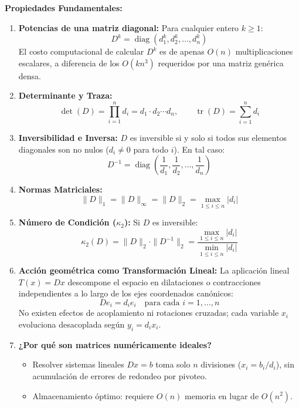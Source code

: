 \documentclass[11pt,a4paper]{article}
\begin{document}
\textbf{Propiedades Fundamentales:}
\begin{enumerate}
    \item \textbf{Potencias de una matriz diagonal:} Para cualquier entero $k \ge 1$:
    \[
    D^k = \operatorname{diag}(d_1^k, d_2^k, \dots, d_n^k)
    \]
    El costo computacional de calcular $D^k$ es de apenas $O(n)$ multiplicaciones escalares, a diferencia de los $O(k n^3)$ requeridos por una matriz genérica densa.
    
    \item \textbf{Determinante y Traza:}
    \[
    \det(D) = \prod_{i=1}^n d_i = d_1 \cdot d_2 \cdots d_n, \qquad \operatorname{tr}(D) = \sum_{i=1}^n d_i
    \]
    
    \item \textbf{Inversibilidad e Inversa:} $D$ es inversible si y solo si todos sus elementos diagonales son no nulos ($d_i \neq 0$ para todo $i$). En tal caso:
    \[
    D^{-1} = \operatorname{diag}\left(\frac{1}{d_1}, \frac{1}{d_2}, \dots, \frac{1}{d_n}\right)
    \]
    
    \item \textbf{Normas Matriciales:}
    \[
    \|D\|_1 = \|D\|_\infty = \|D\|_2 = \max_{1 \le i \le n} |d_i|
    \]
    
    \item \textbf{Número de Condición ($\kappa_2$):} Si $D$ es inversible:
    \[
    \kappa_2(D) = \|D\|_2 \cdot \|D^{-1}\|_2 = \frac{\max_{1 \le i \le n} |d_i|}{\min_{1 \le i \le n} |d_i|}
    \]
    
    \item \textbf{Acción geométrica como Transformación Lineal:} La aplicación lineal $T(x) = D x$ descompone el espacio en dilataciones o contracciones independientes a lo largo de los ejes coordenados canónicos:
    \[
    D e_i = d_i e_i \quad \text{para cada } i = 1, \dots, n
    \]
    No existen efectos de acoplamiento ni rotaciones cruzadas; cada variable $x_i$ evoluciona desacoplada según $y_i = d_i x_i$.
    
    \item \textbf{¿Por qué son matrices numéricamente ideales?}
    \begin{itemize}
        \item Resolver sistemas lineales $D x = b$ toma solo $n$ divisiones ($x_i = b_i / d_i$), sin acumulación de errores de redondeo por pivoteo.
        \item Almacenamiento óptimo: requiere $O(n)$ memoria en lugar de $O(n^2)$.
    \end{itemize}
\end{enumerate}
\end{document}
